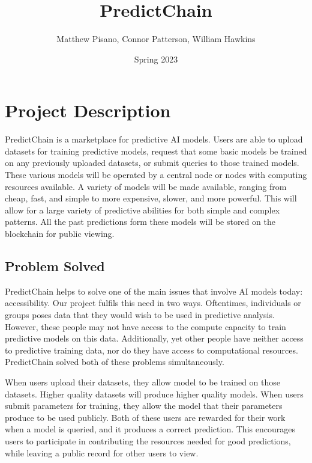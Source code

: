 \documentclass{article}
\title{PredictChain}
\author{Matthew Pisano, Connor Patterson, William Hawkins}
\date{Spring 2023}
\begin{document}
    \maketitle

    \section{Project Description}

    PredictChain is a marketplace for predictive AI models. Users are able to upload datasets for training predictive models,
    request that some basic models be trained on any previously uploaded datasets, or submit queries to those trained models.
    These various models will be operated by a central node or nodes with computing resources available. A variety of
    models will be made available, ranging from cheap, fast, and simple to more expensive, slower, and more powerful.
    This will allow for a large variety of predictive abilities for both simple and complex patterns.  All the past
    predictions form these models will be stored on the blockchain for public viewing.

    \subsection{Problem Solved}

    PredictChain helps to solve one of the main issues that involve AI models today: accessibility.  Our project fulfils this
    need in two ways.  Oftentimes, individuals or groups poses data that they would wish to be used in predictive analysis.
    However, these people may not have access to the compute capacity to train predictive models on this data.  Additionally,
    yet other people have neither access to predictive training data, nor do they have access to computational resources.
    PredictChain solved both of these problems simultaneously.

    When users upload their datasets, they allow model to be trained on those datasets.  Higher quality datasets will produce
    higher quality models.  When users submit parameters for training, they allow the model that their parameters produce to
    be used publicly.  Both of these users are rewarded for their work when a model is queried, and it produces a correct
    prediction.  This encourages users to participate in contributing the resources needed for good predictions, while
    leaving a public record for other users to view.
\end{document}
